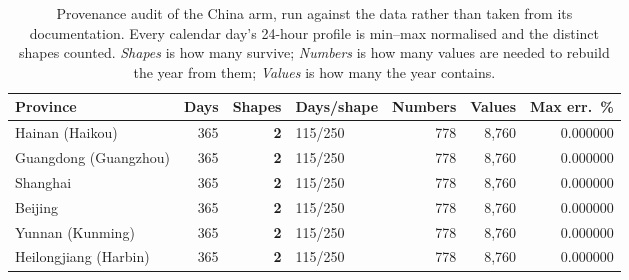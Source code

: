 \begin{table}[t]
\centering
\footnotesize
\setlength{\tabcolsep}{3pt}
\begin{tabular}{lrrlrrr}
\toprule
Province & Days & Shapes & Days/shape & Numbers & Values & Max err.\ \% \\
\midrule
Hainan (Haikou) & 365 & \textbf{2} & 115/250 & 778 & 8,760 & 0.000000 \\
Guangdong (Guangzhou) & 365 & \textbf{2} & 115/250 & 778 & 8,760 & 0.000000 \\
Shanghai & 365 & \textbf{2} & 115/250 & 778 & 8,760 & 0.000000 \\
Beijing & 365 & \textbf{2} & 115/250 & 778 & 8,760 & 0.000000 \\
Yunnan (Kunming) & 365 & \textbf{2} & 115/250 & 778 & 8,760 & 0.000000 \\
Heilongjiang (Harbin) & 365 & \textbf{2} & 115/250 & 778 & 8,760 & 0.000000 \\
\bottomrule
\end{tabular}
\caption{Provenance audit of the China arm, run against the data rather than taken from its documentation. Every calendar day's 24-hour profile is min--max normalised and the distinct shapes counted. \emph{Shapes} is how many survive; \emph{Numbers} is how many values are needed to rebuild the year from them; \emph{Values} is how many the year contains.}
\label{tab:china-audit}
\end{table}
